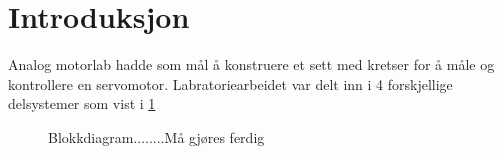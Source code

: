 \section{Introduksjon}\label{sec:intro}

Analog motorlab hadde som mål å konstruere et sett med kretser for å måle og kontrollere en servomotor. Labratoriearbeidet var delt inn i 4 forskjellige delsystemer som vist i \ref{fig:blokkdiagram}


\begin{figure}[h]
    \centering
    
    \caption{Blokkdiagram........Må gjøres ferdig}
    \label{fig:blokkdiagram}
\end{figure}






